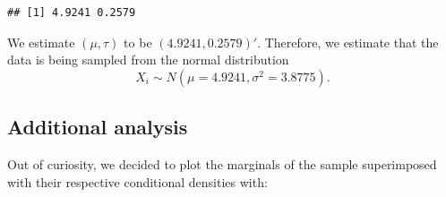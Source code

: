 \documentclass[
  11pt,
]{paper}
\newenvironment{Shaded}{\begin{snugshade}}{\end{snugshade}}
\newcommand{\AttributeTok}[1]{\textcolor[rgb]{0.13,0.29,0.53}{#1}}
\newcommand{\DecValTok}[1]{\textcolor[rgb]{0.00,0.00,0.81}{#1}}
\newcommand{\FloatTok}[1]{\textcolor[rgb]{0.00,0.00,0.81}{#1}}
\newcommand{\FunctionTok}[1]{\textcolor[rgb]{0.13,0.29,0.53}{\textbf{#1}}}
\newcommand{\NormalTok}[1]{#1}
\newcommand{\OtherTok}[1]{\textcolor[rgb]{0.56,0.35,0.01}{#1}}
\newcommand{\SpecialCharTok}[1]{\textcolor[rgb]{0.81,0.36,0.00}{\textbf{#1}}}
\newcommand{\StringTok}[1]{\textcolor[rgb]{0.31,0.60,0.02}{#1}}
\begin{document}
\begin{verbatim}
## [1] 4.9241 0.2579
\end{verbatim}

We estimate \((\mu,\tau)\) to be \((4.9241, 0.2579)'\). Therefore, we
estimate that the data is being sampled from the normal distribution
\begin{equation}
  X_i \sim N(\mu=4.9241,\sigma^2=3.8775).
\end{equation}

\hypertarget{additional-analysis}{%
\subsection{Additional analysis}\label{additional-analysis}}

Out of curiosity, we decided to plot the marginals of the sample
superimposed with their respective conditional densities with:

\begin{Shaded}
\end{Shaded}
\end{document}

